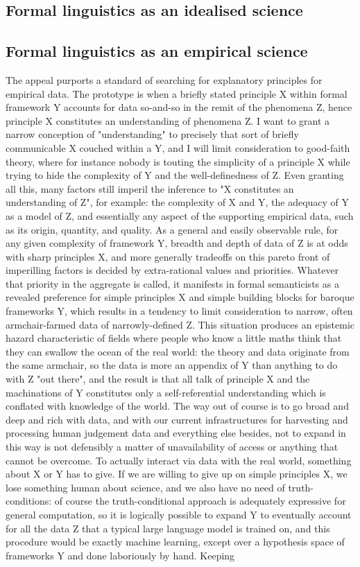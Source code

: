 \subsection{Formal linguistics as an idealised science}


\subsection{Formal linguistics as an empirical science}
The appeal purports a standard of searching for explanatory principles for empirical data. The prototype is when a briefly stated principle X within formal framework Y accounts for data so-and-so in the remit of the phenomena Z, hence principle X constitutes an understanding of phenomena Z. I want to grant a narrow conception of "understanding" to precisely that sort of briefly communicable X couched within a Y, and I will limit consideration to good-faith theory, where for instance nobody is touting the simplicity of a principle X while trying to hide the complexity of Y and the well-definedness of Z. Even granting all this, many factors still imperil the inference to "X constitutes an understanding of Z", for example: the complexity of X and Y, the adequacy of Y as a model of Z, and essentially any aspect of the supporting empirical data, such as its origin, quantity, and quality. As a general and easily observable rule, for any given complexity of framework Y, breadth and depth of data of Z is at odds with sharp principles X, and more generally tradeoffs on this pareto front of imperilling factors is decided by extra-rational values and priorities. Whatever that priority in the aggregate is called, it manifests in formal semanticists as a revealed preference for simple principles X and simple building blocks for baroque frameworks Y, which results in a tendency to limit consideration to narrow, often armchair-farmed data of narrowly-defined Z. This situation produces an epistemic hazard characteristic of fields where people who know a little maths think that they can swallow the ocean of the real world: the theory and data originate from the same armchair, so the data is more an appendix of Y than anything to do with Z "out there", and the result is that all talk of principle X and the machinations of Y constitutes only a self-referential understanding which is conflated with knowledge of the world. The way out of course is to go broad and deep and rich with data, and with our current infrastructures for harvesting and processing human judgement data and everything else besides, not to expand in this way is not defensibly a matter of unavailability of access or anything that cannot be overcome. To actually interact via data with the real world, something about X or Y has to give. If we are willing to give up on simple principles X, we lose something human about science, and we also have no need of truth-conditions: of course the truth-conditional approach is adequately expressive for general computation, so it is logically possible to expand Y to eventually account for all the data Z that a typical large language model is trained on, and this procedure would be exactly machine learning, except over a hypothesis space of frameworks Y and done laboriously by hand. Keeping 